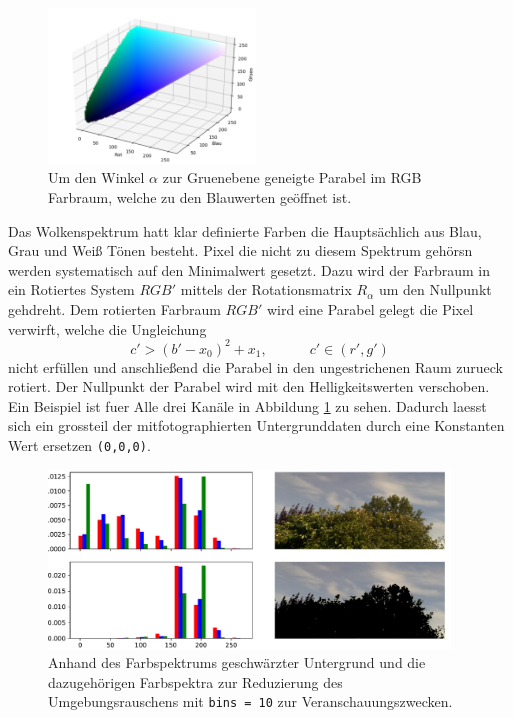 \begin{figure}
		\centering
		\includegraphics[width=0.49\textwidth]{pictures/cut_cube.pdf}
		\caption{Um den Winkel $\alpha$ zur Gruenebene geneigte Parabel im RGB 
				Farbraum, welche zu den Blauwerten geöffnet ist.}
				\label{fig:parabular}
\end{figure}
Das Wolkenspektrum hatt klar definierte Farben die Hauptsächlich aus Blau, Grau
und Weiß Tönen besteht.
Pixel die nicht zu diesem Spektrum gehörsn werden systematisch auf den
Minimalwert gesetzt.
Dazu wird der Farbraum in ein Rotiertes System $RGB'$ mittels der 
Rotationsmatrix $R_{\alpha}$ um den Nullpunkt gehdreht. 
Dem rotierten Farbraum $RGB'$ wird eine Parabel gelegt die Pixel verwirft, 
welche die Ungleichung 
\begin{equation}
		c' > (b' - x_0)^2 + x_1, \hspace{3em} c' \in (r', g')
\end{equation}
nicht erfüllen und anschließend die Parabel in den ungestrichenen Raum zurueck
rotiert.
Der Nullpunkt der Parabel wird mit den Helligkeitswerten verschoben.
Ein Beispiel ist fuer Alle  drei Kanäle in Abbildung \ref{fig:parabular} zu sehen.
Dadurch laesst sich ein grossteil der mitfotographierten Untergrunddaten durch
eine Konstanten Wert ersetzen \texttt{(0,0,0)}.
\begin{figure}
		\centering
		\includegraphics[width=0.95\textwidth]{pictures/cut_hist.pdf}
		\caption{Anhand des Farbspektrums geschwärzter Untergrund und die
		dazugehörigen Farbspektra zur Reduzierung des Umgebungsrauschens mit
		\texttt{bins = 10} zur Veranschauungszwecken.}
		\label{fig:name}
\end{figure}

